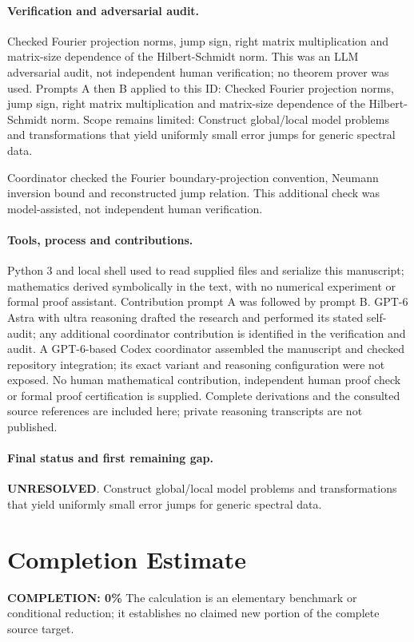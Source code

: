 \documentclass[11pt]{article}
\begin{document}
\paragraph{Verification and adversarial audit.}
Checked Fourier projection norms, jump sign, right matrix multiplication and matrix-size dependence of the Hilbert-Schmidt norm. This was an LLM adversarial audit, not independent human verification; no theorem prover was used. Prompts A then B applied to this ID: Checked Fourier projection norms, jump sign, right matrix multiplication and matrix-size dependence of the Hilbert-Schmidt norm. Scope remains limited: Construct global/local model problems and transformations that yield uniformly small error jumps for generic spectral data.

Coordinator checked the Fourier boundary-projection convention, Neumann inversion bound and reconstructed jump relation. This additional check was model-assisted, not independent human verification.

\paragraph{Tools, process and contributions.}
Python 3 and local shell used to read supplied files and serialize this manuscript; mathematics derived symbolically in the text, with no numerical experiment or formal proof assistant. Contribution prompt A was followed by prompt B. GPT-6 Astra with ultra reasoning drafted the research and performed its stated self-audit; any additional coordinator contribution is identified in the verification and audit. A GPT-6-based Codex coordinator assembled the manuscript and checked repository integration; its exact variant and reasoning configuration were not exposed. No human mathematical contribution, independent human proof check or formal proof certification is supplied. Complete derivations and the consulted source references are included here; private reasoning transcripts are not published.

\paragraph{Final status and first remaining gap.}
\textbf{UNRESOLVED}. Construct global/local model problems and transformations that yield uniformly small error jumps for generic spectral data.

\section{Completion Estimate}
\noindent\textbf{COMPLETION: 0\%}
The calculation is an elementary benchmark or conditional reduction; it establishes no claimed new portion of the complete source target.
\end{document}

